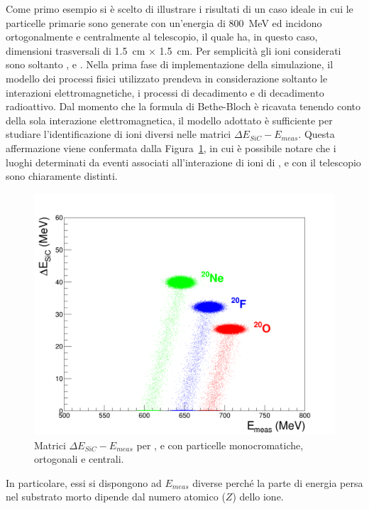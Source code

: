 Come primo esempio si è scelto di illustrare i risultati di un caso ideale in cui le particelle primarie sono generate con un'energia di 800~MeV ed incidono ortogonalmente e centralmente al telescopio, il quale ha, in questo caso, dimensioni trasversali di 1.5~cm $\times$ 1.5~cm.
Per semplicità gli ioni considerati sono soltanto ,  e .
Nella prima fase di implementazione della simulazione, il modello dei processi fisici utilizzato prendeva in considerazione soltanto le interazioni elettromagnetiche, i processi di decadimento e di decadimento radioattivo.
Dal momento che la formula di Bethe-Bloch è ricavata tenendo conto della sola interazione elettromagnetica, il modello adottato è sufficiente per studiare l'identificazione di ioni diversi nelle matrici $\Delta E_{SiC} - E_{meas}$.
Questa affermazione viene confermata dalla Figura~\ref{fig:deltaE_ETot}, in cui è possibile notare che i luoghi determinati da eventi associati all'interazione di ioni di ,  e  con il telescopio sono chiaramente distinti.
\begin{figure} [!t]
	\centering
	\includegraphics[width=\textwidth, keepaspectratio]{Grafici_Tesi2/Particelle_monocromatiche/deltaE_ETot_quadrata.png}
	\caption{Matrici $\Delta E_{SiC} - E_{meas}$ per ,  e  con particelle monocromatiche, ortogonali e centrali.} \label{fig:deltaE_ETot}
\end{figure}
In particolare, essi si dispongono ad $E_{meas}$ diverse perché la parte di energia persa nel substrato morto dipende dal numero atomico ($Z$) dello ione.
